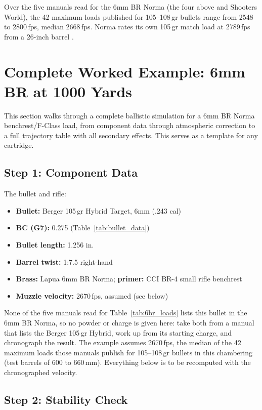 \documentclass[11pt,twoside,openright]{report}
\begin{document}
Over the five manuals read for the 6mm BR Norma (the four above and Shooters World), the 42 maximum loads published for 105--108\,gr bullets range from 2548 to 2800\,fps, median 2668\,fps. Norma rates its own 105\,gr match load at 2789\,fps from a 26-inch barrel \citep{norma6mmbr_diamondline}.

\section{Complete Worked Example: 6mm BR at 1000 Yards}
\label{sec:6br_example}

This section walks through a complete ballistic simulation for a 6mm BR Norma benchrest/F-Class load, from component data through atmospheric correction to a full trajectory table with all secondary effects. This serves as a template for any cartridge.

\subsection{Step 1: Component Data}

The bullet and rifle:
\begin{itemize}[nosep]
  \item \textbf{Bullet:} Berger 105\,gr Hybrid Target, 6mm (.243 cal)
  \item \textbf{BC (G7):} 0.275 (Table~\ref{tab:bullet_data})
  \item \textbf{Bullet length:} 1.256 in.\ \citep{berger_charts}
  \item \textbf{Barrel twist:} 1:7.5 right-hand
  \item \textbf{Brass:} Lapua 6mm BR Norma; \textbf{primer:} CCI BR-4 small rifle benchrest
  \item \textbf{Muzzle velocity:} 2670\,fps, assumed (see below)
\end{itemize}

None of the five manuals read for Table~\ref{tab:6br_loads} lists this bullet in the 6mm BR Norma, so no powder or charge is given here: take both from a manual that lists the Berger 105\,gr Hybrid, work up from its starting charge, and chronograph the result. The example assumes 2670\,fps, the median of the 42 maximum loads those manuals publish for 105--108\,gr bullets in this chambering (test barrels of 600 to 660\,mm). Everything below is to be recomputed with the chronographed velocity.

\subsection{Step 2: Stability Check}
\end{document}
